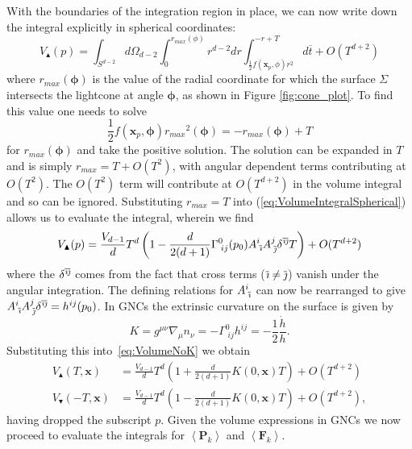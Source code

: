 \documentclass[12pt]{article}
\newcommand{\be}{\begin{equation}}
\newcommand{\ee}{\end{equation}}
\newcommand{\BF}[1]{\mathbf{F}_{#1}}
\newcommand{\BP}[1]{\mathbf{P}_{#1}}
\newcommand{\ibar}{{\overline{\emph\i}}}
\newcommand{\jbar}{{\overline{\emph\j}}}
\begin{document}
With the boundaries of the integration region in place, we can now write down the integral explicitly in spherical coordinates:
\be\label{eq:VolumeIntegralSpherical}
V_\blacktriangle (p)=\int_{S^{d-2}}
d\Omega_{d-2}
\int_{0}^{r_{max} (\phi)}r^{d-2}dr
\int_{\frac{1}{2}f (\mathbf{x}_p,\phi)r^2}^{-r+T}
d\overline{t}+O (T^{d+2})
\ee
where $r_{max} (\boldsymbol\phi)$ is the value of the radial coordinate for which the surface $\Sigma$ intersects the lightcone at angle $\boldsymbol\phi$, as shown in Figure \ref{fig:cone_plot}. To find this value one needs to solve 
\be
\frac{1}{2}f (\mathbf{x}_p,\boldsymbol\phi){r_{max}}^2 (\boldsymbol\phi)=-r_{max} (\boldsymbol\phi)+T
\ee 
for $r_{max} (\boldsymbol\phi)$ and take the positive solution. The solution can be expanded in $T$ and is simply $r_{max}=T+O (T^2)$, with angular dependent terms contributing at $O (T^2)$. The $O (T^2)$ term will contribute at $O (T^{d+2})$ in the volume integral and so can be ignored. Substituting $r_{max}=T$ into (\ref{eq:VolumeIntegralSpherical}) allows us to evaluate the integral, wherein we find 
\be\label{eq:VolumeNoK}
V_\blacktriangle (p)
=\frac{V_{d-1}}{d}T^d\left (1-\frac{d}{2 (d+1)}\Gamma^{0}_{\;ij} (p_0)A^{i}_{\;\ibar}A^{j}_{\;\jbar}\delta^{\ibar\jbar}T\right)
+O (T^{d+2})
\ee
where the $\delta^{\ibar\jbar}$ comes from the fact that cross terms ($\ibar\neq \jbar$) vanish under the angular integration. The defining relations for $A^{i}_{\;\ibar}$ can now be rearranged to give $A^{i}_{\;\ibar}A^{j}_{\;\jbar}\delta^{\ibar\jbar}=h^{ij} (p_0)$. In GNCs the extrinsic curvature on the surface is given by
\be\label{eq:K}
K
=g^{\mu\nu }\nabla_{\mu}n_{\nu}
=-\Gamma^{0}_{\;ij}h^{ij}=-\frac{1}{2}\frac{\dot{h}}{h}.
\ee
Substituting this into~\eqref{eq:VolumeNoK} we obtain 
\begin{align}
V_\blacktriangle (T,\mathbf x)
&=\frac{V_{d-1}}{d}T^d\left (1+\frac{d}{2 (d+1)}K (0,\mathbf{x})T\right)
+O (T^{d+2}) \label{eq:TopVolumeWithK}\\
V_\blacktriangledown (-T,\mathbf x)
&=\frac{V_{d-1}}{d}T^d\left (1-\frac{d}{2 (d+1)}K (0,\mathbf{x})T\right)
+O (T^{d+2}), \label{eq:BottomVolumeWithK}
\end{align}
having dropped the subscript $p$. Given the volume expressions in GNCs we now proceed to evaluate the integrals for $\left\langle \BP{k}\right\rangle$ and $\left\langle \BF{k}\right\rangle$.
\end{document}
